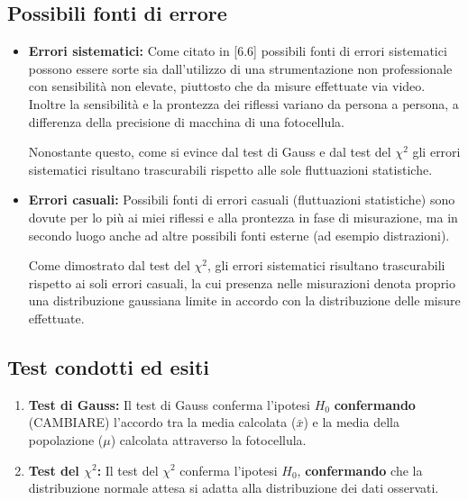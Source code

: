 \documentclass{article}
\begin{document}
\subsection{Possibili fonti di errore}
\begin{itemize}
	\item \textbf{Errori sistematici:} Come citato in [6.6] possibili fonti di errori sistematici possono essere sorte sia dall'utilizzo di una strumentazione non professionale con sensibilità non elevate, piuttosto che da misure effettuate via video. Inoltre la sensibilità e la prontezza dei riflessi variano da persona a persona, a differenza della precisione di macchina di una fotocellula.
	
	Nonostante questo, come si evince dal test di Gauss e dal test del $\chi^2$ gli errori sistematici risultano trascurabili rispetto alle sole fluttuazioni statistiche.
	
	\item \textbf{Errori casuali:} Possibili fonti di errori casuali (fluttuazioni statistiche) sono dovute per lo più ai miei riflessi e alla prontezza in fase di misurazione, ma in secondo luogo anche ad altre possibili fonti esterne (ad esempio distrazioni).
	
	Come dimostrato dal test del $\chi^2$, gli errori sistematici risultano trascurabili rispetto ai soli errori casuali, la cui presenza nelle misurazioni denota proprio una distribuzione gaussiana limite in accordo con la distribuzione delle misure effettuate.

\end{itemize}

\subsection{Test condotti ed esiti}
\begin{enumerate}
	\item \textbf{Test di Gauss:} Il test di Gauss conferma l'ipotesi $H_0$ \textbf{confermando} (CAMBIARE) l'accordo tra la media  calcolata ($\bar{x}$) e la media della popolazione ($\mu$) calcolata attraverso la fotocellula.
	\item \textbf{Test del $\chi^2$:} Il test del $\chi^2$ conferma l'ipotesi $H_0$, \textbf{confermando} che la distribuzione normale attesa si adatta alla distribuzione dei dati osservati.
\end{enumerate}
\end{document}
